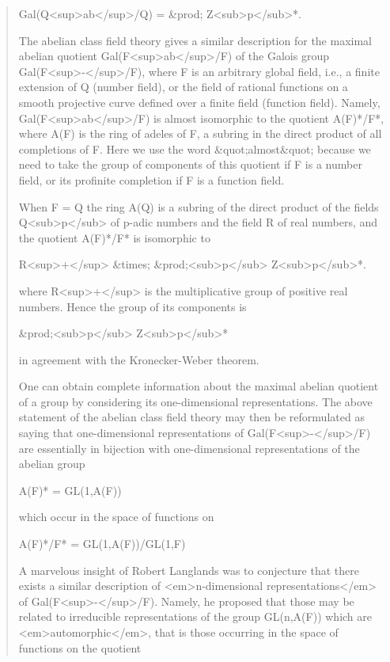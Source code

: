 \begin{quote}
  Gal(Q<sup>ab</sup>/Q) = &prod; Z<sub>p</sub>*.

  The abelian class field theory gives a similar description for the
  maximal abelian quotient Gal(F<sup>ab</sup>/F) of the Galois group 
  Gal(F<sup>-</sup>/F), 
  where F is an arbitrary global field, i.e., a finite extension of 
  Q (number field), or the field of rational functions on a smooth 
  projective curve defined over a finite field (function field).  
  Namely, Gal(F<sup>ab</sup>/F) is almost isomorphic to the quotient A(F)*/F*, 
  where A(F) is the ring of adeles of F, a subring in the direct 
  product of all completions of F.  Here we use the word &quot;almost&quot; 
  because we need to take the group of components of this quotient 
  if F is a number field, or its profinite completion if F is a 
  function field.

  When F = Q the ring A(Q) is a subring of the direct product of the 
  fields Q<sub>p</sub> of p-adic numbers and the field R of real numbers, and 
  the quotient A(F)*/F* is isomorphic to 

  R<sup>+</sup> &times; &prod;<sub>p</sub> Z<sub>p</sub>*. 

  where R<sup>+</sup> is the multiplicative group of positive real numbers.
  Hence the group of its components is

  &prod;<sub>p</sub> Z<sub>p</sub>*

  in agreement with the Kronecker-Weber theorem.

  One can obtain complete information about the maximal abelian 
  quotient of a group by considering its one-dimensional 
  representations.  The above statement of the abelian class field 
  theory may then be reformulated as saying that one-dimensional 
  representations of Gal(F<sup>-</sup>/F) are essentially in bijection with 
  one-dimensional representations of the abelian group 

  A(F)* = GL(1,A(F)) 

  which occur in the space of functions on

  A(F)*/F* = GL(1,A(F))/GL(1,F)

  A marvelous insight of Robert Langlands was to conjecture that 
  there exists a similar description of <em>n-dimensional 
  representations</em> of Gal(F<sup>-</sup>/F). Namely, he proposed that those 
  may be related to irreducible representations of the group 
  GL(n,A(F)) which are <em>automorphic</em>, that is those occurring in 
  the space of functions on the quotient 


\end{quote}
